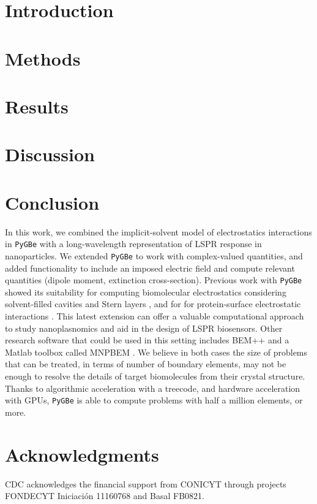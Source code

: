\documentclass[final,5p,times,twocolumn]{elsarticle}
\newcommand{\pygbe}{\texttt{PyGBe}\xspace}
\begin{document}

\section{Introduction}\label{sec:intro}


\section{Methods}\label{sec:methods}
 

\section{Results} \label{sec:results}


\section{Discussion} \label{sec:discussion}


\section{Conclusion}
%

In this work, we combined the implicit-solvent model of electrostatics interactions in \pygbe 
with a long-wavelength representation of LSPR response in nanoparticles. 
We extended \pygbe to work with complex-valued quantities, and added functionality to 
include an imposed electric field and compute relevant quantities 
(dipole moment, extinction cross-section). 
Previous work with \pygbe showed its suitability for computing 
biomolecular electrostatics considering solvent-filled cavities and Stern layers \cite{CooperBardhanBarba2013}, 
and for for protein-surface electrostatic interactions \cite{CooperBarba2016}.
This latest extension can offer a valuable computational approach to study nanoplasnomics and aid in the design of LSPR biosensors. 
Other research software that could be used in this setting includes  
BEM++ \cite{SmigajETal2015} and a Matlab toolbox called MNPBEM \cite{HohenesterTrugler2012}. 
We believe in both cases the size of problems that can be treated, in terms of number of boundary elements, may not be enough to resolve the details of target biomolecules from their crystal structure. 
Thanks to algorithmic acceleration with a treecode, and hardware acceleration with GPUs, \pygbe is able to compute problems with half a million elements, or more.



\section*{Acknowledgments}

CDC acknowledges the financial support from CONICYT through projects FONDECYT Iniciaci\'on 11160768 and Basal FB0821.


\end{document}
